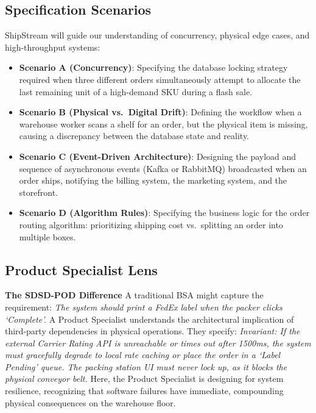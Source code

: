 \documentclass[
  11pt,
  openany,
  oneside]{book}
\providecommand{\tightlist}{%
  \setlength{\itemsep}{0pt}\setlength{\parskip}{0pt}}
\renewenvironment{quote}{\begin{customquote}}{\end{customquote}}
\begin{document}
\subsection{Specification Scenarios}\label{specification-scenarios-2}

ShipStream will guide our understanding of concurrency, physical edge
cases, and high-throughput systems:

\begin{itemize}
\tightlist
\item
  \textbf{Scenario A (Concurrency)}: Specifying the database locking
  strategy required when three different orders simultaneously attempt
  to allocate the last remaining unit of a high-demand SKU during a
  flash sale.
\item
  \textbf{Scenario B (Physical vs.~Digital Drift)}: Defining the
  workflow when a warehouse worker scans a shelf for an order, but the
  physical item is missing, causing a discrepancy between the database
  state and reality.
\item
  \textbf{Scenario C (Event-Driven Architecture)}: Designing the payload
  and sequence of asynchronous events (Kafka or RabbitMQ) broadcasted
  when an order ships, notifying the billing system, the marketing
  system, and the storefront.
\item
  \textbf{Scenario D (Algorithm Rules)}: Specifying the business logic
  for the order routing algorithm: prioritizing shipping cost
  vs.~splitting an order into multiple boxes.
\end{itemize}

\subsection{Product Specialist Lens}\label{product-specialist-lens-2}

\begin{quote}
\textbf{The SDSD-POD Difference} A traditional BSA might capture the
requirement: \emph{The system should print a FedEx label when the packer
clicks `Complete'.} A Product Specialist understands the architectural
implication of third-party dependencies in physical operations. They
specify: \emph{Invariant: If the external Carrier Rating API is
unreachable or times out after 1500ms, the system must gracefully
degrade to local rate caching or place the order in a `Label Pending'
queue. The packing station UI must never lock up, as it blocks the
physical conveyor belt.} Here, the Product Specialist is designing for
system resilience, recognizing that software failures have immediate,
compounding physical consequences on the warehouse floor.
\end{quote}
\end{document}
